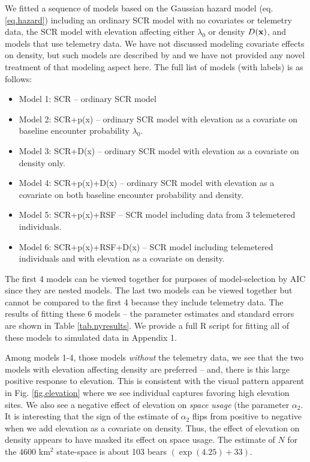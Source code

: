 \documentclass[12pt]{article}
\begin{document}
We fitted a sequence of models based on the Gaussian hazard model
(eq. \ref{eq.hazard})  including an ordinary SCR model with no
covariates or telemetry data, the SCR model with elevation affecting either
$\lambda_{0}$ or density $D({\bf x})$, and models that use telemetry data. We have not discussed modeling
covariate effects on density, but such models are described by
\citet{borchers_efford:2008} and we have not provided any novel
treatment of that modeling aspect here.
The full list of models (with labels) is as follows:
\begin{itemize}
\item[] Model 1: SCR -- ordinary SCR model
\item[] Model 2: SCR+p(x) -- ordinary SCR model with elevation as a
  covariate on baseline encounter probability $\lambda_{0}$.
\item[] Model 3: SCR+D(x) -- ordinary SCR model with elevation as a
  covariate on density only.
\item[] Model 4: SCR+p(x)+D(x) -- ordinary SCR model with elevation as
  a covariate on both baseline encounter probability and density.
\item[] Model 5: SCR+p(x)+RSF -- SCR model including data from 3
  telemetered individuals.
\item[] Model 6: SCR+p(x)+RSF+D(x) -- SCR model including telemetered
  individuals and with elevation as a covariate on density.
\end{itemize}
The first 4 models can be viewed together for purposes of
model-selection by AIC since they are nested models. The last two
models can be viewed together but cannot be compared to the first 4
because they include telemetry data.
The results of fitting these 6 models -- the parameter estimates and
standard errors are shown in Table \ref{tab.nyresults}.
We provide a full R script for fitting  all of these models to
simulated data in Appendix 1.


Among models 1-4, those models {\it without} the telemetry data, we
see that the two models with elevation affecting density  are preferred -- and, there is this
large positive response to elevation. This is consistent with the
visual pattern apparent in Fig. \ref{fig.elevation} where we see
individual captures favoring high elevation sites.  We also see a
negative effect of elevation on {\it space usage} (the parameter
$\alpha_{2}$.  It is interesting %
that
the sign of the estimate of $\alpha_{2}$ flips from positive to
negative when we add elevation as a covariate on density. Thus, the
effect of elevation on density appears to have masked its effect on
space usage.  The estimate of $N$ for the 4600 km$^2$ state-space is
about 103 bears $(\exp(4.25)+33)$.
\end{document}
